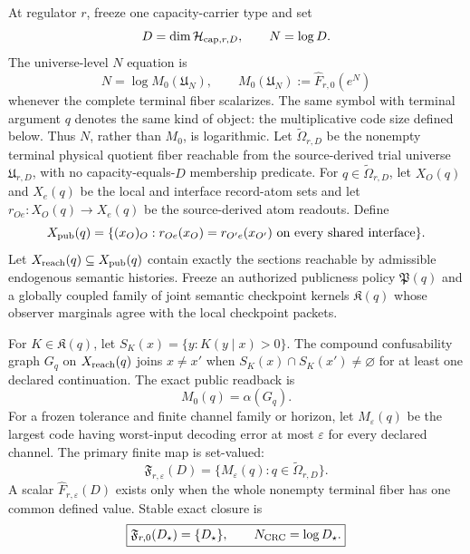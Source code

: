 \begin{definition}
\label{def:self-closure-density}
At regulator \(r\), freeze one capacity-carrier type and set
\[
D=\dim\mathcal H_{{\rm cap},r,D},
\qquad N=\log D.
\]
The universe-level \(N\) equation is
\[
\boxed{N=\log M_0(\mathfrak U_N)},
\qquad
M_0(\mathfrak U_N):=\widehat F_{r,0}(e^N)
\]
whenever the complete terminal fiber scalarizes. The same symbol with terminal
argument $q$ denotes the same kind of object: the multiplicative code size
defined below. Thus \(N\), rather than \(M_0\), is logarithmic.
Let \(\widetilde\Omega_{r,D}\) be the nonempty terminal physical quotient
fiber reachable from the source-derived trial universe \(\mathfrak U_{r,D}\),
with no capacity-equals-\(D\) membership predicate. For
\(q\in\widetilde\Omega_{r,D}\), let \(X_O(q)\) and \(X_e(q)\) be the local
and interface record-atom sets and let
\(r_{Oe}:X_O(q)\to X_e(q)\) be the source-derived atom readouts. Define
\[
X_{\rm pub}(q)=
\{(x_O)_O:r_{Oe}(x_O)=r_{O'e}(x_{O'})
\text{ on every shared interface}\}.
\]
Let \(X_{\rm reach}(q)\subseteq X_{\rm pub}(q)\) contain exactly the sections
reachable by admissible endogenous semantic histories. Freeze an authorized
publicness policy \(\mathfrak P(q)\) and a globally coupled family of joint
semantic checkpoint kernels \(\mathfrak K(q)\) whose observer marginals agree
with the local checkpoint packets.

For \(K\in\mathfrak K(q)\), let
\(S_K(x)=\{y:K(y\mid x)>0\}\). The compound confusability graph \(G_q\) on
\(X_{\rm reach}(q)\) joins \(x\ne x'\) when
\(S_K(x)\cap S_K(x')\ne\varnothing\) for at least one declared continuation.
The exact public readback is
\[
M_0(q)=\alpha(G_q).
\]
For a frozen tolerance and finite channel family or horizon, let
\(M_\varepsilon(q)\) be the largest code having worst-input decoding error at
most \(\varepsilon\) for every declared channel. The primary finite map is
set-valued:
\[
\boxed{
\mathfrak F_{r,\varepsilon}(D)=
\{M_\varepsilon(q):q\in\widetilde\Omega_{r,D}\}.
}
\]
A scalar \(\widehat F_{r,\varepsilon}(D)\) exists only when the whole
nonempty terminal fiber has one common defined value. Stable exact closure is
\[
\boxed{
\mathfrak F_{r,0}(D_\star)=\{D_\star\},
\qquad N_{\rm CRC}=\log D_\star.
}
\]
\end{definition}

